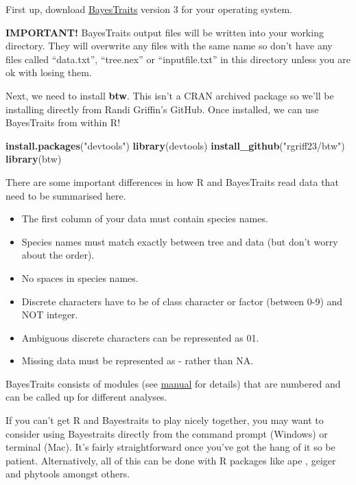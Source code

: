 \documentclass[
]{book}
\newenvironment{Shaded}{\begin{snugshade}}{\end{snugshade}}
\newcommand{\KeywordTok}[1]{\textcolor[rgb]{0.13,0.29,0.53}{\textbf{#1}}}
\newcommand{\NormalTok}[1]{#1}
\newcommand{\StringTok}[1]{\textcolor[rgb]{0.31,0.60,0.02}{#1}}
\providecommand{\tightlist}{%
  \setlength{\itemsep}{0pt}\setlength{\parskip}{0pt}}
\begin{document}
First up, download \href{http://www.evolution.rdg.ac.uk/BayesTraitsV3.0.2/BayesTraitsV3.0.2.html}{BayesTraits} version 3 for your operating system.

\textbf{IMPORTANT!} BayesTraits output files will be written into your working directory. They will overwrite any files with the same name so don't have any files called ``data.txt'', ``tree.nex'' or ``inputfile.txt'' in this directory unless you are ok with losing them.

Next, we need to install \textbf{btw}. This isn't a CRAN archived package so we'll be installing directly from Randi Griffin's GitHub. Once installed, we can use BayesTraits from within R!

\begin{Shaded}
\begin{Highlighting}[]
\KeywordTok{install.packages}\NormalTok{(}\StringTok{"devtools"}\NormalTok{)}
\KeywordTok{library}\NormalTok{(devtools)}
\KeywordTok{install\_github}\NormalTok{(}\StringTok{"rgriff23/btw"}\NormalTok{)}
\KeywordTok{library}\NormalTok{(btw)}
\end{Highlighting}
\end{Shaded}

There are some important differences in how R and BayesTraits read data that need to be summarised here.

\begin{itemize}
\tightlist
\item
  The first column of your data must contain species names.
\item
  Species names must match exactly between tree and data (but don't worry about the order).
\item
  No spaces in species names.
\item
  Discrete characters have to be of class character or factor (between 0-9) and NOT integer.
\item
  Ambiguous discrete characters can be represented as 01.
\item
  Missing data must be represented as - rather than NA.
\end{itemize}

BayesTraits consists of modules (see \href{http://www.evolution.rdg.ac.uk/BayesTraitsV3.0.2/Files/BayesTraitsV3.0.2Manual.pdf}{manual} for details) that are numbered and can be called up for different analyses.

If you can't get R and Bayestraits to play nicely together, you may want to consider using Bayestraits directly from the command prompt (Windows) or terminal (Mac). It's fairly straightforward once you've got the hang of it so be patient. Alternatively, all of this can be done with R packages like ape \citep{ape}, geiger \citep{geiger} and phytools \citep{phytools} amongst others.
\end{document}
